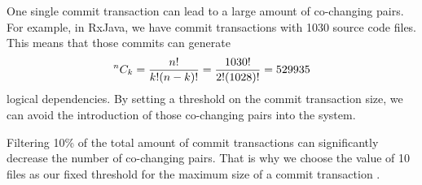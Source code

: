 One single commit transaction can lead to a large amount of co-changing pairs. For example, in RxJava, we have commit transactions with 1030 source code files. This means that those commits can generate  
\[
{}^{n}C_{k}=\frac{n!}{k!(n-k)!} = \frac{1030!}{2!(1028)!} = 529 935
\]
logical dependencies. By setting a threshold on the commit transaction size, we can avoid the introduction of those co-changing pairs into the system.  

Filtering 10\% of the total amount of commit transactions can significantly decrease the number of co-changing pairs. That is why we choose the value of 10 files as our fixed threshold for the maximum size of a commit transaction \cite{DepSACI}.



\begin{table}[!h]
\renewcommand{\arraystretch}{1}
\caption{Commit transaction size(cs) trend and average per system.}
\label{table:cs_values}
\centering
{}
\end{table}
